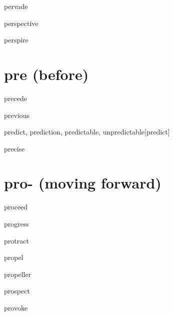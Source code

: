 \begin{RefWord}{pervade}
\end{RefWord}

\begin{RefWord}{perspective}
\end{RefWord}

\begin{RefWord}{perspire}
\end{RefWord}

\section{pre (before)}
\begin{RefWord}{precede}
\end{RefWord}

\begin{RefWord}{previous}
\end{RefWord}

\begin{RefWord}{predict, prediction, predictable, unpredictable}[predict]
\end{RefWord}

\begin{RefWord}{precise}
\end{RefWord}

\section{pro- (moving forward)}

\begin{RefWord}{proceed}
\end{RefWord}

\begin{RefWord}{progress}
\end{RefWord}

\begin{RefWord}{protract}
\end{RefWord}

\begin{RefWord}{propel}
\end{RefWord}

\begin{RefWord}{propeller}
\end{RefWord}

\begin{RefWord}{prospect}
\end{RefWord}

\begin{RefWord}{provoke}
\end{RefWord}

